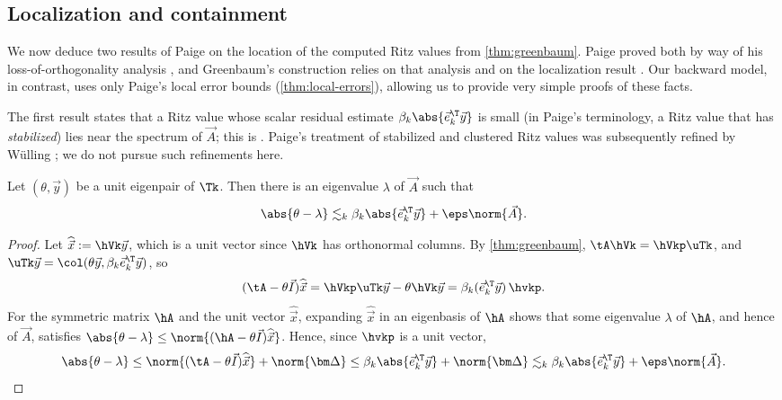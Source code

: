 \subsection{Localization and containment}
\label{sec:ritz-consequences}

We now deduce two results of Paige on the location of the computed Ritz values from \cref{thm:greenbaum}.
Paige proved both by way of his loss-of-orthogonality analysis \cite[Lemma~3.1 and Theorem~3.1]{paige1980}, and Greenbaum's construction relies on that analysis and on the localization result \cite[\S4--5]{greenbaum1989}.
Our backward model, in contrast, uses only Paige's local error bounds (\cref{thm:local-errors}), allowing us to provide very simple proofs of these facts.


The first result states that a Ritz value whose scalar residual estimate \(\beta_k\abs{\vec e_k^\T\vec y}\) is small (in Paige's terminology, a Ritz value that has \emph{stabilized}) lies near the spectrum of \(\vec A\); this is \cite[Theorem~3.1]{paige1980}.
Paige's treatment of stabilized and clustered Ritz values was subsequently refined by W\"{u}lling \cite{wulling2005}; we do not pursue such refinements here.

\begin{theorem}
\label{thm:stabilized}
Let \((\theta,\vec y)\) be a unit eigenpair of \(\Tk\).
Then there is an eigenvalue \(\lambda\) of \(\vec A\) such that
\[
 \abs{\theta-\lambda}
 \lesssim_k \beta_k\abs{\vec e_k^\T\vec y}+\eps\norm{\vec A}.
\]
\end{theorem}

\begin{proof}
Let \(\widehat{\vec x}:=\hVk\vec y\), which is a unit vector since \(\hVk\) has orthonormal columns.
By \cref{thm:greenbaum}, \(\tA\hVk=\hVkp\uTk\), and \(\uTk\vec y=\col(\theta\vec y,\beta_k\vec e_k^\T\vec y)\), so
\[
 (\tA-\theta\vec I)\widehat{\vec x}
 =\hVkp\uTk\vec y-\theta\hVk\vec y
 =\beta_k(\vec e_k^\T\vec y)\,\hvkp.
\]
For the symmetric matrix \(\hA\) and the unit vector \(\widehat{\vec x}\), expanding \(\widehat{\vec x}\) in an eigenbasis of \(\hA\) shows that some eigenvalue \(\lambda\) of \(\hA\), and hence of \(\vec A\), satisfies \(\abs{\theta-\lambda}\le\norm{(\hA-\theta\vec I)\widehat{\vec x}}\).
Hence, since \(\hvkp\) is a unit vector,
\[
 \abs{\theta-\lambda}
 \le\norm{(\tA-\theta\vec I)\widehat{\vec x}}
  +\norm{\bm\Delta}
  \le\beta_k\abs{\vec e_k^\T\vec y}+\norm{\bm\Delta}
 \lesssim_k\beta_k\abs{\vec e_k^\T\vec y}+\eps\norm{\vec A}.\qedhere
\]
\end{proof}

